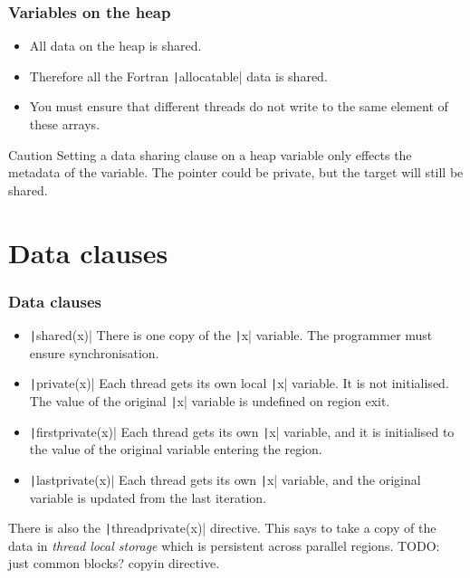 \documentclass{beamer}
\begin{document}
\begin{frame}
\frametitle{Variables on the heap}
\begin{itemize}
  \item All data on the heap is shared.
  \item Therefore all the Fortran \texttt|allocatable| data is shared.
  \item You must ensure that different threads do not write to the same element of these arrays.
\end{itemize}

\begin{alertblock}{Caution}
Setting a data sharing clause on a heap variable only effects the metadata of the variable.
The pointer could be private, but the target will still be shared.
\end{alertblock}
\end{frame}

\section{Data clauses}
\begin{frame}
\frametitle{Data clauses}
\begin{itemize}
  \item \texttt|shared(x)|
    There is one copy of the \texttt|x| variable. The programmer must ensure synchronisation.
  \item \texttt|private(x)|
    Each thread gets its own local \texttt|x| variable. It is not initialised. The value of the original \texttt|x| variable is undefined on region exit.
  \item \texttt|firstprivate(x)|
    Each thread gets its own \texttt|x| variable, and it is initialised to the value of the original variable entering the region.
  \item \texttt|lastprivate(x)|
    Each thread gets its own \texttt|x| variable, and the original variable is updated from the last iteration.
\end{itemize}

There is also the \texttt|threadprivate(x)| directive.
This says to take a copy of the data in \emph{thread local storage} which is persistent across parallel regions.
TODO: just common blocks? copyin directive.
\end{frame}
\end{document}
